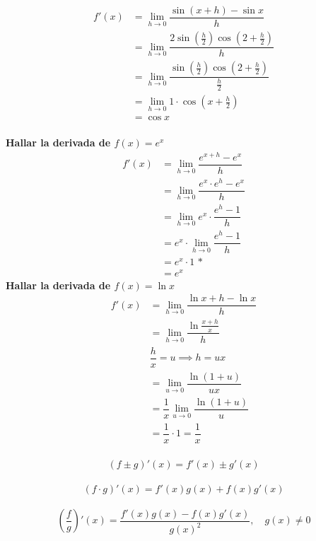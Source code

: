 \documentclass[12pt,a4paper,fleqn]{article}
\begin{document}
\begin{align*}
    f'(x) & =\lim_{h\to0}\dfrac{\sin (x+h)-\sin x}{h}                                \\
          & =\lim_{h\to0}\dfrac{2\sin (\frac{h}{2})\cos (2+\frac{h}{2})}{h}          \\
          & =\lim_{h\to0}\dfrac{\sin (\frac{h}{2})\cos (2+\frac{h}{2})}{\frac{h}{2}} \\
          & =\lim_{h\to0}1\cdot\cos(x+\frac{h}{2})                                   \\
          & =\cos x
\end{align*}\\[10pt]
\textbf{Hallar la derivada de $f(x)= e^x$}
\begin{align*}
    f'(x) & = \lim_{h \to 0} \dfrac{e^{x+h} - e^x}{h}       \\
          & = \lim_{h \to 0} \dfrac{e^x \cdot e^h - e^x}{h} \\
          & = \lim_{h \to 0} e^x \cdot \dfrac{e^h - 1}{h}   \\
          & = e^x \cdot \lim_{h \to 0} \dfrac{e^h - 1}{h}   \\
          & = e^x \cdot 1 \text{ *}                         \\
          & = e^x
\end{align*}
\textbf{Hallar la derivada de $f(x)= \ln x$}
\begin{align*}
    f'(x) & = \lim_{h \to 0} \dfrac{\ln{x+h} - \ln x}{h}      \\
          & = \lim_{h \to 0} \dfrac{\ln{\frac{x+h}{x}}}{h}    \\
          & \dfrac{h}{x}=u \implies h=ux                      \\
          & = \lim_{u \to 0} \dfrac{\ln (1+u)}{ux}            \\
          & = \dfrac{1}{x}\lim_{u \to 0} \dfrac{\ln (1+u)}{u} \\
          & = \dfrac{1}{x}\cdot 1 = \dfrac{1}{x}              \\
\end{align*}

\begin{tcolorbox}[colback=white!95!blue, colframe=blue!40!black, title=Teoremas de Álgebra de Derivadas]
    \[  
        (f \pm g)'(x) = f'(x) \pm g'(x) 
    \]\
    \[
        (f \cdot g)'(x) = f'(x) g(x) + f(x) g'(x) 
    \]\
    \[
        \left( \frac{f}{g} \right)'(x) = \frac{f'(x) g(x) - f(x) g'(x)}{g(x)^2}, \quad g(x) \neq 0
    \]
\end{tcolorbox}
\end{document}
